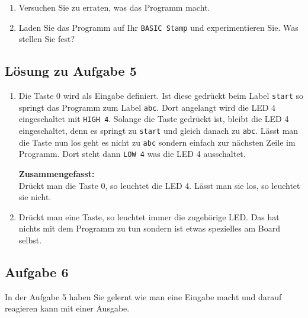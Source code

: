 

\begin{enumerate}[label=(\alph*)]
	\item Versuchen Sie zu erraten, was das
	Programm macht.
	\item Laden Sie das Programm auf Ihr \verb!BASIC Stamp! und
	experimentieren Sie. Was stellen Sie fest?
\end{enumerate}

\ifteacher
\newpage
\subsection{Lösung zu Aufgabe 5}
\begin{enumerate}[label=(\alph*)]
	\item Die Taste 0 wird als Eingabe definiert. Ist diese gedrückt
	beim Label \lstinline{start} so springt das Programm zum Label 
	\lstinline{abc}. Dort angelangt wird die LED 4 eingeschaltet mit
	\lstinline{HIGH 4}. Solange die Taste gedrückt ist, bleibt die
	LED 4 eingeschaltet, denn es springt zu \lstinline{start} und
	gleich danach zu \lstinline{abc}. Lässt man die Taste nun los
	geht es nicht zu \lstinline{abc} sondern einfach zur nächsten Zeile
	im Programm. Dort steht dann \lstinline{LOW 4} was die LED 4
	ausschaltet.

	\textbf{Zusammengefasst:}\\
	Drückt man die Taste 0, so leuchtet die LED 4.
	Lässt man sie los, so leuchtet sie nicht.
	\item Drückt man eine Taste, so leuchtet immer die zugehörige LED.
	Das hat nichts mit dem Programm zu tun sondern ist etwas spezielles
	am Board selbst.
\end{enumerate}
\fi

\newpage
\subsection{Aufgabe 6}
In der Aufgabe 5 haben Sie gelernt wie man eine Eingabe macht und darauf
reagieren kann mit einer Ausgabe.

